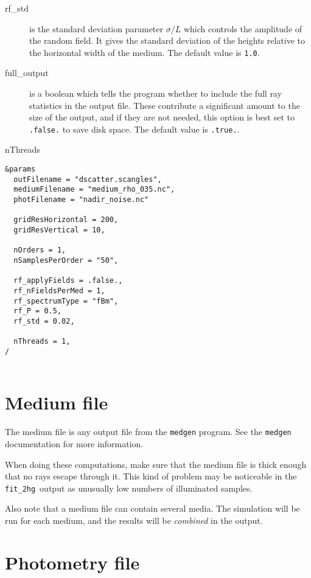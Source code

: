 \documentclass[a4paper]{article}
\newcommand{\code}[1]{\lstinline{#1}}
\newcommand{\this}[0]{\texttt{fit\_2hg}}
\begin{document}
\begin{description}
	\item[rf\_std] is the standard deviation parameter $\sigma/L$ which controls the amplitude of the random field. It gives the standard deviation of the heights relative to the horizontal width of the medium. The default value is \code{1.0}.
	\item[full\_output] is a boolean which tells the program whether to include the full ray statistics in the output file. These contribute a significant amount to the size of the output, and if they are not needed, this option is best set to \code{.false.} to save disk space. The default value is \code{.true.}.
	\item[nThreads] %
\end{description}

\begin{lstlisting}[float, frame=trbl, caption="Example input file", label=inputlst]
&params
  outFilename = "dscatter.scangles",
  mediumFilename = "medium_rho_035.nc",
  photFilename = "nadir_noise.nc"

  gridResHorizontal = 200,
  gridResVertical = 10,

  nOrders = 1,
  nSamplesPerOrder = "50",

  rf_applyFields = .false.,
  rf_nFieldsPerMed = 1,
  rf_spectrumType = "fBm",
  rf_P = 0.5,
  rf_std = 0.02,

  nThreads = 1,
/
	
\end{lstlisting}

\section{Medium file}\label{medium}

The medium file is any output file from the \code{medgen} program. See the \code{medgen} documentation for more information. 

When doing these computations, make sure that the medium file is thick enough that no rays escape through it. This kind of problem may be noticeable in the \this~output as unusually low numbers of illuminated samples.

Also note that a medium file can contain several media. The simulation will be run for each medium, and the results will be \emph{combined} in the output.

\section{Photometry file}\label{phot}
\end{document}
